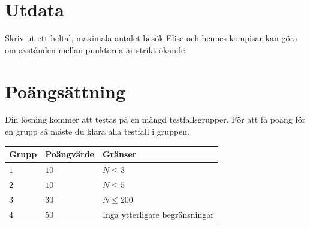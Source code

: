 \section*{Utdata}
Skriv ut ett heltal, maximala antalet besök Elise och hennes kompisar kan göra om avstånden mellan punkterna är strikt ökande.

\section*{Poängsättning}
Din lösning kommer att testas på en mängd testfallsgrupper.
För att få poäng för en grupp så måste du klara alla testfall i gruppen.

\noindent
\begin{tabular}{| l | l | l |}
\hline
Grupp & Poängvärde & Gränser \\ \hline
$1$    & $10$         & $N \leq 3$ \\ \hline
$2$    & $10$         & $N \leq 5$ \\ \hline
$3$    & $30$         & $N \leq 200$ \\ \hline
$4$    & $50$         & Inga ytterligare begränsningar \\ \hline
\end{tabular}
